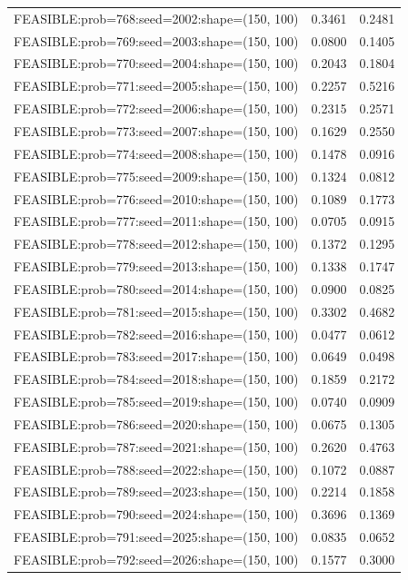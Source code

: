 \begin{longtable}{lcc}
FEASIBLE:prob=768:seed=2002:shape=(150, 100) &   0.3461 & 0.2481 \\
FEASIBLE:prob=769:seed=2003:shape=(150, 100) &   0.0800 & 0.1405 \\
FEASIBLE:prob=770:seed=2004:shape=(150, 100) &   0.2043 & 0.1804 \\
FEASIBLE:prob=771:seed=2005:shape=(150, 100) &   0.2257 & 0.5216 \\
FEASIBLE:prob=772:seed=2006:shape=(150, 100) &   0.2315 & 0.2571 \\
FEASIBLE:prob=773:seed=2007:shape=(150, 100) &   0.1629 & 0.2550 \\
FEASIBLE:prob=774:seed=2008:shape=(150, 100) &   0.1478 & 0.0916 \\
FEASIBLE:prob=775:seed=2009:shape=(150, 100) &   0.1324 & 0.0812 \\
FEASIBLE:prob=776:seed=2010:shape=(150, 100) &   0.1089 & 0.1773 \\
FEASIBLE:prob=777:seed=2011:shape=(150, 100) &   0.0705 & 0.0915 \\
FEASIBLE:prob=778:seed=2012:shape=(150, 100) &   0.1372 & 0.1295 \\
FEASIBLE:prob=779:seed=2013:shape=(150, 100) &   0.1338 & 0.1747 \\
FEASIBLE:prob=780:seed=2014:shape=(150, 100) &   0.0900 & 0.0825 \\
FEASIBLE:prob=781:seed=2015:shape=(150, 100) &   0.3302 & 0.4682 \\
FEASIBLE:prob=782:seed=2016:shape=(150, 100) &   0.0477 & 0.0612 \\
FEASIBLE:prob=783:seed=2017:shape=(150, 100) &   0.0649 & 0.0498 \\
FEASIBLE:prob=784:seed=2018:shape=(150, 100) &   0.1859 & 0.2172 \\
FEASIBLE:prob=785:seed=2019:shape=(150, 100) &   0.0740 & 0.0909 \\
FEASIBLE:prob=786:seed=2020:shape=(150, 100) &   0.0675 & 0.1305 \\
FEASIBLE:prob=787:seed=2021:shape=(150, 100) &   0.2620 & 0.4763 \\
FEASIBLE:prob=788:seed=2022:shape=(150, 100) &   0.1072 & 0.0887 \\
FEASIBLE:prob=789:seed=2023:shape=(150, 100) &   0.2214 & 0.1858 \\
FEASIBLE:prob=790:seed=2024:shape=(150, 100) &   0.3696 & 0.1369 \\
FEASIBLE:prob=791:seed=2025:shape=(150, 100) &   0.0835 & 0.0652 \\
FEASIBLE:prob=792:seed=2026:shape=(150, 100) &   0.1577 & 0.3000 \\

\end{longtable}
